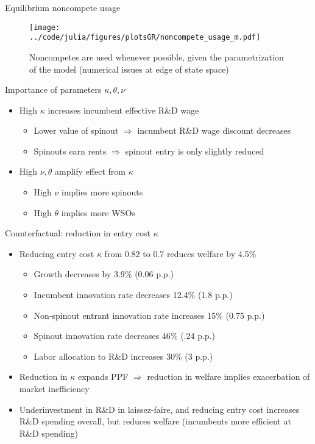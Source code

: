 \documentclass[english,usenames,dvipsnames]{beamer}
\begin{document}
\begin{frame}{Equilibrium noncompete usage}
\begin{figure}
	\centering
	\texttt{[image: ../code/julia/figures/plotsGR/noncompete\_usage\_m.pdf]}
	\caption{Noncompetes are used whenever possible, given the parametrization of the model (numerical issues at edge of state space)}
\end{figure}
\end{frame}


\begin{frame}{Importance of parameters $\kappa,\theta,\nu$}
\begin{itemize}
	\item High $\kappa$ increases incumbent effective R\&D wage
	\begin{itemize}
		\item Lower value of spinout $\Rightarrow$ incumbent R\&D wage discount decreases
		\item Spinouts earn rents $\Rightarrow$ spinout entry is only slightly reduced
	\end{itemize}
	\item High $\nu , \theta$ amplify effect from $\kappa$
	\begin{itemize}
		\item High $\nu$ implies more spinouts
		\item High $\theta$ implies more WSOs
	\end{itemize}
\end{itemize}
\end{frame}

\begin{frame}{Counterfactual: reduction in entry cost $\kappa$}
\begin{itemize}
	\item Reducing entry cost $\kappa$ from $0.82$ to $0.7$ reduces welfare by 4.5\%
	\begin{itemize}
		\item Growth decreases by 3.9\% (0.06 p.p.)
		\item Incumbent innovation rate decreases 12.4\% (1.8 p.p.) 
		\item Non-spinout entrant innovation rate increases 15\% (0.75 p.p.)
		\item Spinout innovation rate decreases 46\% (.24 p.p.)
		\item Labor allocation to R\&D increases 30\% (3 p.p.)
	\end{itemize}
	\item Reduction in $\kappa$ expands PPF $\Rightarrow$ reduction in welfare implies exacerbation of market inefficiency 
	\item Underinvestment in R\&D in laissez-faire, and reducing entry cost increases R\&D spending overall, but reduces welfare (incumbents more efficient at R\&D spending)
\end{itemize}
\end{frame}
\end{document}

